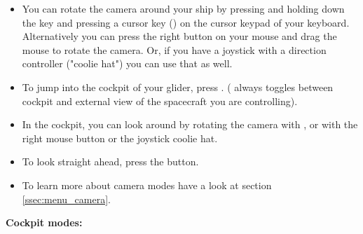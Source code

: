 \documentclass[Orbiter User Manual.tex]{subfiles}
\begin{document}
\begin{itemize}
\item You can rotate the camera around your ship by pressing and holding down the \Ctrl key and pressing a cursor key (\DArrow\UArrow\RArrow\LArrow) on the cursor keypad of your keyboard. Alternatively you can press the right button on your mouse and drag the mouse to rotate the camera. Or, if you have a joystick with a direction controller ("coolie hat") you can use that as well.
\item To jump into the cockpit of your glider, press . ( always toggles between cockpit and external view of the spacecraft you are controlling).
\item In the cockpit, you can look around by rotating the camera with \Alt\DArrow\UArrow\RArrow\LArrow, or with the right mouse button or the joystick coolie hat.
\item To look straight ahead, press the \Home button.
\item To learn more about camera modes have a look at section \ref{ssec:menu_camera}.
\end{itemize}

\noindent
\textbf{Cockpit modes:}
\end{document}
